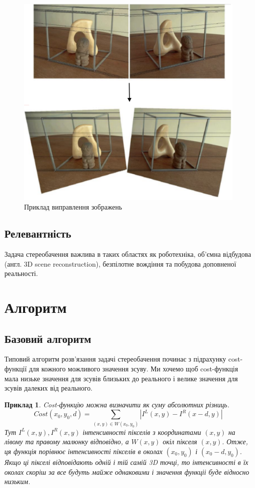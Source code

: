 \documentclass{article}
\newtheorem*{example*}{Приклад}
\theoremstyle{definition}
\begin{document}
\begin{figure}[h]
	\includegraphics[width=0.7\linewidth]{rectification_example}
	\centering
	\caption{Приклад виправлення зображень}
	\label{fig:rectification_example}
\end{figure}

\subsection{Релевантність}
Задача стереобачення важлива в таких областях як роботехніка, об'ємна відбудова (англ. 3D scene reconstruction), безпілотне вождіння та побудова доповненої реальності.

\section{Алгоритм}
\subsection{Базовий алгоритм}
Типовий алгоритм розв'язання задачі стереобачення починає з підрахунку cost-функції для кожного можливого значення зсуву. Ми хочемо щоб cost-функція мала низьке значення для зсувів близьких до реального і велике значення для зсувів далеких від реального. 
\begin{example*}
	Cost-функцію можна визначити як суму абсолютних різниць.
	\[ Cost(x_0, y_0, d) = \sum_{(x, y) \in W(x_0,y_0)} \left| I^L(x, y) - I^R(x - d, y) \right| \]
	Тут $I^L(x,y), I^R(x,y)$ інтенсивності пікселів з координатами $(x,y)$ на лівому та правому малюнку відповідно, а $W(x,y)$ окіл пікселя $(x,y)$. Отже, ця функція порівнює інтенсивності пікселів в околах $(x_0, y_0)$ і $(x_0 - d, y_0)$. Якщо ці пікселі відповідають одній і тій самій 3D точці, то інтенсивності в їх околах скоріш за все будуть майже однаковими і значення функціі буде відносно низьким.
\end{example*}
\end{document}
